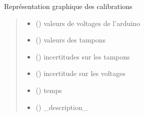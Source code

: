 \documentclass[letterpaper,10pt,french]{sphinxmanual}
\begin{document}
\begin{fulllineitems}
\label{\detokenize{library:lib_pH.plot_calib}}
\pysigstartsignatures
\pysiglinewithargsret
{}
{\sphinxparamcomma {}\sphinxparamcomma {}\sphinxparamcomma {}\sphinxparamcomma {}\sphinxparamcomma {}\sphinxparamcomma {}\sphinxparamcomma {}\sphinxparamcomma {}\sphinxparamcomma {}\sphinxparamcomma {}}
{}
\pysigstopsignatures
\sphinxAtStartPar
Représentation graphique des calibrations
\begin{quote}\begin{description}
\begin{itemize}
\item {} 
\sphinxAtStartPar
{} () \textendash{} valeurs de voltages de l’arduino

\item {} 
\sphinxAtStartPar
{} () \textendash{} valeurs des tampons

\item {} 
\sphinxAtStartPar
{} () \textendash{} incertitudes sur les tampons

\item {} 
\sphinxAtStartPar
{} () \textendash{} incertitude sur les voltages

\item {} 
\sphinxAtStartPar
{} () \textendash{} temps

\item {} 
\sphinxAtStartPar
{} () \textendash{} \_description\_


\end{itemize}
\end{description}
\end{quote}
\end{fulllineitems}
\end{document}
